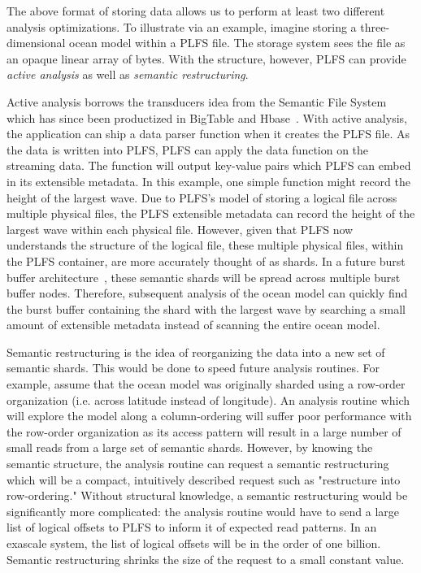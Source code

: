 The above format of storing data allows us to perform at least two different analysis optimizations.  To illustrate via an example, imagine storing a three-dimensional ocean model within a PLFS file. The storage system sees the file as an opaque linear array of bytes.  With the structure, however, PLFS can provide \textit{active analysis} as well as \textit{semantic restructuring}.  

Active analysis borrows the transducers idea from the Semantic File System~\cite{semantic_fs} which has since been productized in BigTable and Hbase~\cite{google_coprocessors,GFS,apache_hbase}.  With active analysis, the application can ship a data parser function when it creates the PLFS file.  As the data is written into PLFS, PLFS can apply the data function on the streaming data.  The function will output key-value pairs which PLFS can embed in its extensible metadata.  In this example, one simple function might record the height of the largest wave.  Due to PLFS's model of storing a logical file across multiple physical files, the PLFS extensible metadata can record the height of the largest wave within each physical file.  However, given that PLFS now understands the structure of the logical file, these multiple physical files, within the PLFS container, are more accurately thought of as shards.  In a future burst buffer architecture~\cite{burst_buffers}, these semantic shards will be spread across multiple burst buffer nodes.  Therefore, subsequent analysis of the ocean model can quickly find the burst buffer containing the shard with the largest wave by searching a small amount of extensible metadata instead of scanning the entire ocean model.

Semantic restructuring is the idea of reorganizing the data into a new set of semantic shards.  This would be done to speed future analysis routines.  For example, assume that the ocean model was originally sharded using a row-order organization (i.e. across latitude instead of longitude).  An analysis routine which will explore the model along a column-ordering will suffer poor performance with the row-order organization as its access pattern will result in a large number of small reads from a large set of semantic shards.  However, by knowing the semantic structure, the analysis routine can request a semantic restructuring which will be a compact, intuitively described request such as "restructure into row-ordering."  Without structural knowledge, a semantic restructuring would be significantly more complicated: the analysis routine would have to send a large list of logical offsets to PLFS to inform it of expected read patterns.  In an exascale system, the list of logical offsets will be in the order of one billion.  Semantic restructuring shrinks the size of the request to a small constant value.


